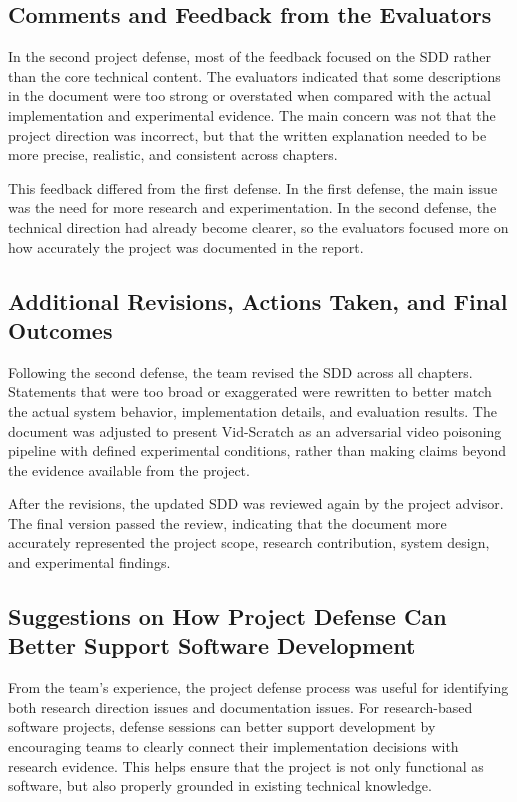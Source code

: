\subsection{Comments and Feedback from the Evaluators}
\label{subsection:second-defense-feedback}

In the second project defense, most of the feedback focused on the SDD
rather than the core technical content. The evaluators indicated that
some descriptions in the document were too strong or overstated when
compared with the actual implementation and experimental evidence. The
main concern was not that the project direction was incorrect, but
that the written explanation needed to be more precise, realistic, and
consistent across chapters.

This feedback differed from the first defense. In the first defense,
the main issue was the need for more research and experimentation. In
the second defense, the technical direction had already become clearer,
so the evaluators focused more on how accurately the project was
documented in the report.

\subsection{Additional Revisions, Actions Taken, and Final Outcomes}
\label{subsection:second-defense-revisions}

Following the second defense, the team revised the SDD across all
chapters. Statements that were too broad or exaggerated were rewritten
to better match the actual system behavior, implementation details,
and evaluation results. The document was adjusted to present
Vid-Scratch as an adversarial video poisoning pipeline with defined
experimental conditions, rather than making claims beyond the evidence
available from the project.

After the revisions, the updated SDD was reviewed again by the project
advisor. The final version passed the review, indicating that the
document more accurately represented the project scope, research
contribution, system design, and experimental findings.

\subsection{Suggestions on How Project Defense Can Better Support Software Development}
\label{subsection:defense-suggestions}

From the team's experience, the project defense process was useful for
identifying both research direction issues and documentation issues.
For research-based software projects, defense sessions can better
support development by encouraging teams to clearly connect their
implementation decisions with research evidence. This helps ensure that
the project is not only functional as software, but also properly
grounded in existing technical knowledge.

